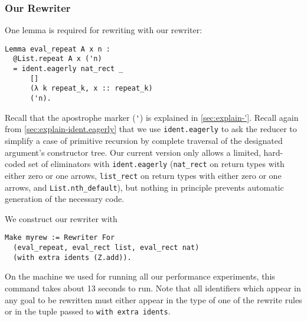 \documentclass[sigplan,10pt,review,anonymous]{acmart}\settopmatter{printfolios=true,printccs=false,printacmref=false}
\begin{document}
\subsubsection{Our Rewriter}
One lemma is required for rewriting with our rewriter:
\begin{verbatim}
Lemma eval_repeat A x n :
  @List.repeat A x ('n)
  = ident.eagerly nat_rect _
      []
      (λ k repeat_k, x :: repeat_k)
      ('n).
\end{verbatim}
Recall that the apostrophe marker (\verb|'|) is explained in \autoref{sec:explain-'}.
Recall again from \autoref{sec:explain-ident.eagerly} that we use \texttt{ident.eagerly} to ask the reducer to simplify a case of primitive recursion by complete traversal of the designated argument's constructor tree.
Our current version only allows a limited, hard-coded set of eliminators with \texttt{ident.eagerly} (\texttt{nat\_rect} on return types with either zero or one arrows, \texttt{list\_rect} on return types with either zero or one arrows, and \texttt{List.nth\_default}), but nothing in principle prevents automatic generation of the necessary code.

We construct our rewriter with
\begin{verbatim}
Make myrew := Rewriter For
  (eval_repeat, eval_rect list, eval_rect nat)
  (with extra idents (Z.add)).
\end{verbatim}
On the machine we used for running all our performance experiments, this command takes about 13 seconds to run.
Note that all identifiers which appear in any goal to be rewritten must either appear in the type of one of the rewrite rules or in the tuple passed to \texttt{with extra idents}.
\end{document}
